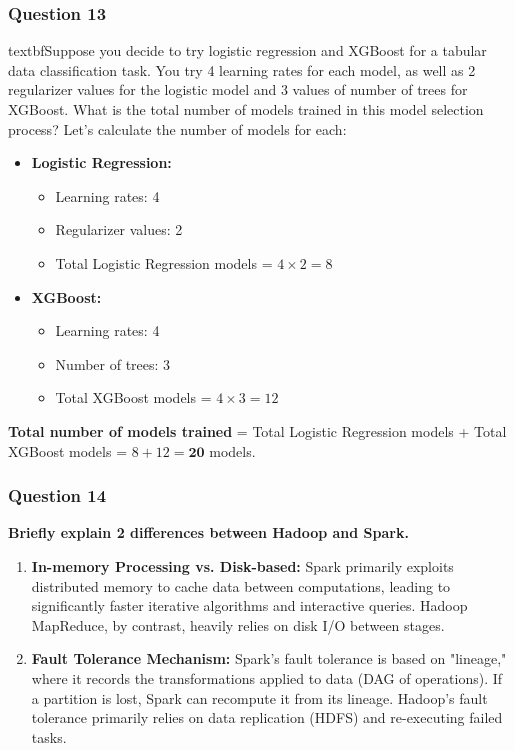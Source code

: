 \documentclass{article}
\begin{document}
\subsubsection*{Question 13}
textbf{Suppose you decide to try logistic regression and XGBoost for a tabular data classification task. You try 4 learning rates for each model, as well as 2 regularizer values for the logistic model and 3 values of number of trees for XGBoost. What is the total number of models trained in this model selection process?}
    Let's calculate the number of models for each:
    \begin{itemize}
        \item \textbf{Logistic Regression:}
            \begin{itemize}
                \item Learning rates: 4
                \item Regularizer values: 2
                \item Total Logistic Regression models = $4 \times 2 = 8$
            \end{itemize}
        \item \textbf{XGBoost:}
            \begin{itemize}
                \item Learning rates: 4
                \item Number of trees: 3
                \item Total XGBoost models = $4 \times 3 = 12$
            \end{itemize}
    \end{itemize}
    \textbf{Total number of models trained} = Total Logistic Regression models + Total XGBoost models = $8 + 12 = \textbf{20}$ models.

\subsubsection*{Question 14}
\textbf{Briefly explain 2 differences between Hadoop and Spark.}
    \begin{enumerate}[label=\alph*)]
        \item \textbf{In-memory Processing vs. Disk-based:} Spark primarily exploits distributed memory to cache data between computations, leading to significantly faster iterative algorithms and interactive queries. Hadoop MapReduce, by contrast, heavily relies on disk I/O between stages.
        \item \textbf{Fault Tolerance Mechanism:} Spark's fault tolerance is based on "lineage," where it records the transformations applied to data (DAG of operations). If a partition is lost, Spark can recompute it from its lineage. Hadoop's fault tolerance primarily relies on data replication (HDFS) and re-executing failed tasks.
    \end{enumerate}
\end{document}
